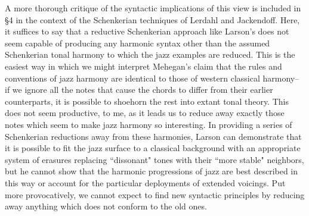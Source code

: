 A more thorough critique of the syntactic implications of this view is included in \S 4 in the context of the Schenkerian techniques of Lerdahl and Jackendoff.  Here, it suffices to say that a reductive Schenkerian approach like Larson's does not seem capable of producing any harmonic syntax other than the assumed Schenkerian tonal harmony to which the jazz examples are reduced.  This is the easiest way in which we might interpret Mehegan's claim that the rules and conventions of jazz harmony are identical to those of western classical harmony-- if we ignore all the notes that cause the chords to differ from their earlier counterparts, it is possible to shoehorn the rest into extant tonal theory.  This does not seem productive, to me, as it leads us to reduce away exactly those notes which seem to make jazz harmony so interesting.  In providing a series of Schenkerian reductions away from these harmonies, Larson can demonstrate that it is possible to fit the jazz surface to a classical background with an appropriate system of erasures replacing ``dissonant" tones with their ``more stable" neighbors, but he cannot show that the harmonic progressions of jazz are best described in this way or account for the particular deployments of extended voicings.  Put more provocatively, we cannot expect to find new syntactic principles by reducing away anything which does not conform to the old ones.

